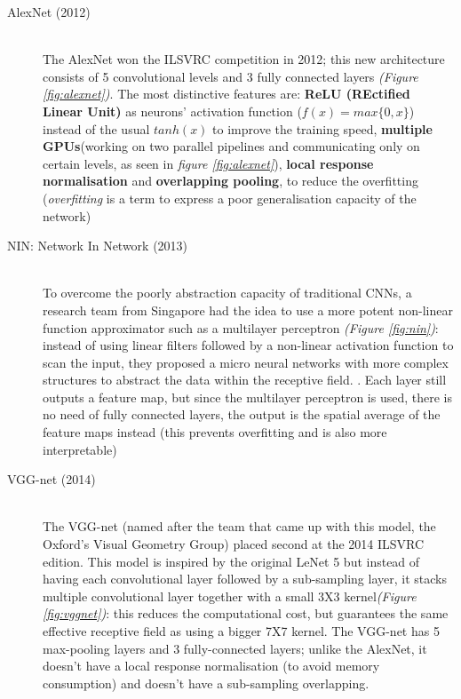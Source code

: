 \documentclass[../main.tex]{subfiles}
\begin{document}
\begin{description}
\item[AlexNet (2012)] \cite{Krizhevsky2012} \hfill \\
The AlexNet won the ILSVRC competition in 2012; this new architecture consists of 5 convolutional levels and 3 fully connected layers \textit{(Figure \ref{fig:alexnet})}. The most distinctive features are: \textbf{ReLU (REctified Linear Unit)} as neurons' activation function ($f(x)=max\{0,x\}$) instead of the usual $tanh(x)$ to improve the training speed, \textbf{multiple GPUs}(working on two parallel pipelines and communicating only on certain levels, as seen in \textit{figure \ref{fig:alexnet}}), \textbf{local response normalisation} and \textbf{overlapping pooling}, to reduce the overfitting \cite{Krizhevsky2012} (\textit{overfitting} is a term to express a poor generalisation capacity of the network)
\item[NIN: Network In Network (2013)] \cite{Lin2013} \hfill \\ 
To overcome the poorly abstraction capacity of traditional CNNs, a research team from Singapore had the idea to use a more potent non-linear function approximator such as a multilayer perceptron \textit{(Figure \ref{fig:nin})}: instead of using linear filters followed by a non-linear activation function to scan the input, they proposed a micro neural networks with more complex structures to abstract the data within the receptive field. \cite{Lin2013}. Each layer still outputs a feature map, but since the multilayer perceptron is used, there is no need of fully connected layers, the output is the spatial average of the feature maps instead (this prevents overfitting and is also more interpretable) \cite{Lin2013}
\item[VGG-net (2014)] \cite{Simonyan2015} \hfill \\
The VGG-net (named after the team that came up with this model, the Oxford's Visual Geometry Group) placed second at the 2014 ILSVRC edition. This model is inspired by the original LeNet 5 \cite{LeCun1998} but instead of having each convolutional layer followed by a sub-sampling layer, it stacks multiple convolutional layer together with a small 3X3 kernel\textit{(Figure \ref{fig:vggnet})}: this reduces the computational cost, but guarantees the same effective receptive field as using a bigger 7X7 kernel.\cite{Simonyan2015}
The VGG-net has 5 max-pooling layers and 3 fully-connected layers; unlike the AlexNet, it doesn't have a local response normalisation (to avoid memory consumption) and doesn't have a sub-sampling overlapping. 

\end{description}
\end{document}
